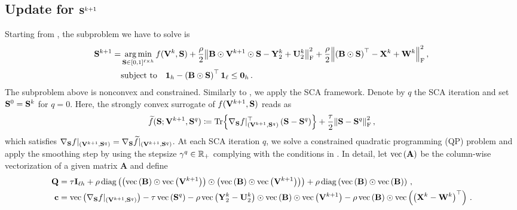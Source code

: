 \subsection{\texorpdfstring{Update for $\mathbf{S}^{k+1}$}{Update for S}}\label{subsec:updateS_partial}
Starting from , the subproblem we have to solve is
\begin{equation}\label{eq:updateS_nonconvex_partial}
    \begin{aligned}
        \mathbf{S}^{k+1}=&\operatorname*{arg\,min}_{\mathbf{S} \in [0,1]^{\ell \times h}} f(\mathbf{V}^{k},\mathbf{S}) + \frac{\rho}{2}\norm{\mathbf{B} \odot \mathbf{V}^{k+1} \odot \mathbf{S} - \mathbf{Y}_2^k +\mathbf{U}_2^k}_{\mathrm{F}}^2 + \frac{\rho}{2}\norm{\left(\mathbf{B} \odot \mathbf{S}\right)^\top - \mathbf{X}^k + \mathbf{W}^k}_{\mathrm{F}}^2\,,\\
        & \textrm{subject to} \quad \boldsymbol{1}_h - \left(\mathbf{B} \odot \mathbf{S}\right)^\top \boldsymbol{1}_\ell \leq \boldsymbol{0}_h\,. \\
    \end{aligned}
\end{equation}
The subproblem above is nonconvex and constrained.
Similarly to , we apply the SCA framework.
Denote by $q$ the SCA iteration and set $\mathbf{S}^0=\mathbf{S}^k$ for $q=0$.
Here, the strongly convex surrogate of $f(\mathbf{V}^{k+1},\mathbf{S})$ reads as
\begin{equation}\label{eq:strongly_convex_surrogate_Spartial}
    \widetilde{f}(\Supp;\V^{k+1}, \Supp^q) \coloneqq \Tr{\Egrad{\Supp}{f}\at{\left(\V^{k+1},\Supp^q\right)}^\top \left(\Supp - \Supp^q\right)} + \frac{\tau}{2}\frob{\Supp -\Supp^q}^2\,,
\end{equation}
which satisfies $\nabla_{\mathbf{S}} f|_{\left(\mathbf{V}^{k+1},\mathbf{S}^q\right)}=\nabla_{\mathbf{S}} \widetilde{f}|_{\left(\mathbf{V}^{k+1},\mathbf{S}^q\right)}$.
At each SCA iteration $q$, we solve a constrained quadratic programming (QP) problem and apply the smoothing step by using the stepsize $\gamma^q \in \mathbb{R}_+$ complying with the conditions in .
In detail, let $\mathrm{vec}\left(\mathbf{A}\right)$ be the column-wise vectorization of a given matrix $\mathbf{A}$ and define
\begin{equation}\label{eq:Q_and_c_Supdate}
    \begin{aligned}
        \mathbf{Q} &= \tau\mathbf{I}_{\ell h} + \rho\,\mathrm{diag}\left( \left(\mathrm{vec}\left(\mathbf{B}\right)\odot\mathrm{vec}\left(\mathbf{V}^{k+1}\right)\right)\odot\left(\mathrm{vec}\left(\mathbf{B}\right)\odot\mathrm{vec}\left(\mathbf{V}^{k+1}\right)\right)\right) + \rho\,\mathrm{diag}\left(\mathrm{vec}\left(\mathbf{B}\right)\odot \mathrm{vec}\left(\mathbf{B}\right)\right)\,,\\
        \mathbf{c} &= \mathrm{vec}\left(\nabla_{\mathbf{S}} f|_{\left(\mathbf{V}^{k+1},\mathbf{S}^q\right)}\right) - \tau\, \mathrm{vec}\left(\mathbf{S}^q\right) - \rho\, \mathrm{vec}\left(\mathbf{Y}_2^k - \mathbf{U}_2^k\right) \odot \mathrm{vec}\left(\mathbf{B}\right) \odot \mathrm{vec}\left(\mathbf{V}^{k+1}\right) - \rho \, \mathrm{vec}\left(\mathbf{B}\right) \odot \mathrm{vec}\left(\left(\mathbf{X}^k - \mathbf{W}^k\right)^\top\right)\,.
    \end{aligned}
\end{equation}
